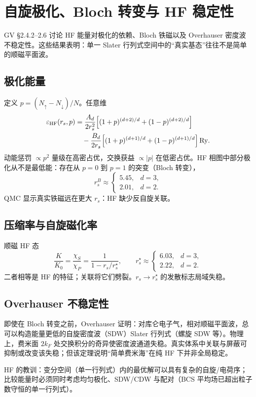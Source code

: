 \section{自旋极化、Bloch 转变与 HF 稳定性}

GV §2.4.2--2.6 讨论 HF 能量对极化的依赖、Bloch 铁磁以及 Overhauser 密度波不稳定性。这些结果表明：单一 Slater 行列式空间中的“真实基态”往往不是简单的顺磁平面波。

\subsection{极化能量}

定义 $p=(N_\uparrow-N_\downarrow)/N$。任意维
\begin{equation}
\begin{aligned}
  \varepsilon_{\mathrm{HF}}(r_s,p)
  &=\frac{A_d}{2r_s^2}
  \Bigl[
  (1+p)^{(d+2)/d}+(1-p)^{(d+2)/d}
  \Bigr]\\
  &\quad
  -\frac{B_d}{2r_s}
  \Bigl[
  (1+p)^{(d+1)/d}+(1-p)^{(d+1)/d}
  \Bigr]
  \,\mathrm{Ry}.
\end{aligned}
\label{eq:HF_pol}
\end{equation}
动能惩罚 $\propto p^2$ 量级在高密占优，交换获益 $\propto |p|$ 在低密占优。HF 相图中部分极化从不是最低能：存在从 $p=0$ 到 $p=1$ 的突变（Bloch 转变），
\begin{equation}
  r_s^{B}
  \approx
  \begin{cases}
    5.45, & d=3,\\
    2.01, & d=2.
  \end{cases}
\end{equation}
QMC 显示真实铁磁远在更大 $r_s$：HF 缺少反自旋关联。

\subsection{压缩率与自旋磁化率}

顺磁 HF 态
\begin{equation}
  \frac{K}{K_0}
  =\frac{\chi_S}{\chi_P}
  =\frac{1}{1-r_s/r_s^\star},
  \qquad
  r_s^\star
  \approx
  \begin{cases}
    6.03, & d=3,\\
    2.22, & d=2.
  \end{cases}
\label{eq:K_HF}
\end{equation}
二者相等是 HF 的特征；关联将它们劈裂。$r_s\to r_s^\star$ 的发散标志局域失稳。

\subsection{Overhauser 不稳定性}

即使在 Bloch 转变之前，Overhauser 证明：对库仑电子气，相对顺磁平面波，总可以构造能量更低的自旋密度波（SDW）Slater 行列式（螺旋 SDW 等）。物理上，费米面 $2k_F$ 处交换积分的奇异使密度波通道失稳。真实体系中关联与屏蔽可抑制或改变该失稳；但该定理说明“简单费米海”在纯 HF 下并非全局稳定。

\begin{note}
HF 的教训：变分空间（单一行列式）内的最优解可以具有复杂的自旋/电荷序；比较能量时必须同时考虑均匀极化、SDW/CDW 与配对（BCS 平均场已超出粒子数守恒的单一行列式）。
\end{note}
